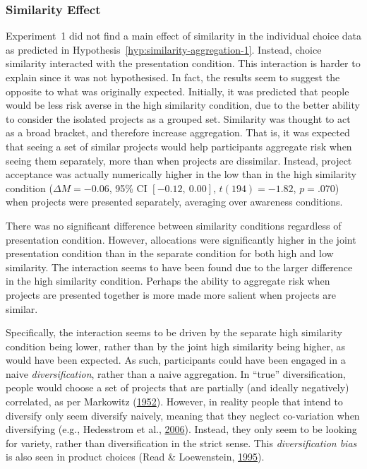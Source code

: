 \documentclass[
  english,
  man, donotrepeattitle,floatsintext]{apa7}
\theoremstyle{definition}
\theoremstyle{definition}
\theoremstyle{definition}
\theoremstyle{definition}
\theoremstyle{remark}
\begin{document}
\hypertarget{similarity-discussion-aggregation-1}{%
\subsubsection{Similarity Effect}\label{similarity-discussion-aggregation-1}}

Experiment~1 did not find a main effect of similarity in the individual choice
data as predicted in Hypothesis~\ref{hyp:similarity-aggregation-1}. Instead,
choice similarity interacted with the presentation condition. This interaction
is harder to explain since it was not hypothesised. In fact, the results seem to
suggest the opposite to what was originally expected. Initially, it was
predicted that people would be less risk averse in the high similarity
condition, due to the better ability to consider the isolated projects as a
grouped set. Similarity was thought to act as a broad bracket, and therefore
increase aggregation. That is, it was expected that seeing a set of similar
projects would help participants aggregate risk when seeing them separately,
more than when projects are dissimilar. Instead, project acceptance was actually
numerically higher in the low than in the high similarity condition
(\(\Delta M = -0.06\), 95\% CI \([-0.12,~0.00]\), \(t(194) = -1.82\), \(p = .070\)) when projects were
presented separately, averaging over awareness conditions.

There was no significant difference between similarity conditions regardless of
presentation condition. However, allocations were significantly higher in the
joint presentation condition than in the separate condition for both high and
low similarity. The interaction seems to have been found due to the larger
difference in the high similarity condition. Perhaps the ability to aggregate
risk when projects are presented together is more made more salient when
projects are similar.

Specifically, the interaction seems to be driven by the separate high similarity
condition being lower, rather than by the joint high similarity being higher, as
would have been expected. As such, participants could have been engaged in a
naive \emph{diversification}, rather than a naive aggregation. In ``true''
diversification, people would choose a set of projects that are partially (and
ideally negatively) correlated, as per Markowitz (\protect\hyperlink{ref-markowitz1952}{1952}). However, in reality
people that intend to diversify only seem diversify naively, meaning that they
neglect co-variation when diversifying (e.g., Hedesstrom et al., \protect\hyperlink{ref-hedesstrom2006}{2006}). Instead, they
only seem to be looking for variety, rather than diversification in the strict
sense. This \emph{diversification bias} is also seen in product choices (Read \& Loewenstein, \protect\hyperlink{ref-read1995}{1995}).
\end{document}
